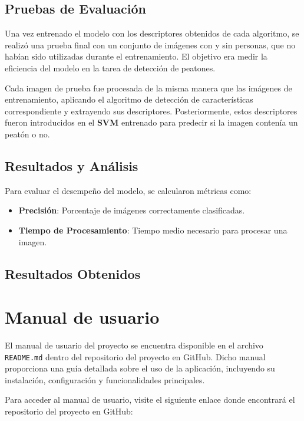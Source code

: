 \documentclass[a4paper]{article}
\begin{document}
\subsection{Pruebas de Evaluación}

Una vez entrenado el modelo con los descriptores obtenidos de cada algoritmo, se realizó una prueba final con un conjunto de imágenes con y sin personas, que no habían sido utilizadas durante el entrenamiento. El objetivo era medir la eficiencia del modelo en la tarea de detección de peatones.

Cada imagen de prueba fue procesada de la misma manera que las imágenes de entrenamiento, aplicando el algoritmo de detección de características correspondiente y extrayendo sus descriptores. Posteriormente, estos descriptores fueron introducidos en el \textbf{SVM} entrenado para predecir si la imagen contenía un peatón o no.

\subsection{Resultados y Análisis}

Para evaluar el desempeño del modelo, se calcularon métricas como:
\begin{itemize}
    \item \textbf{Precisión}: Porcentaje de imágenes correctamente clasificadas.
    \item \textbf{Tiempo de Procesamiento}: Tiempo medio necesario para procesar una imagen.
\end{itemize}


\subsection{Resultados Obtenidos}


\newpage

\section{Manual de usuario}

El manual de usuario del proyecto se encuentra disponible en el archivo \texttt{README.md} dentro del repositorio del proyecto en GitHub. Dicho manual proporciona una guía detallada sobre el uso de la aplicación, incluyendo su instalación, configuración y funcionalidades principales.
\par\hspace{1cm}

Para acceder al manual de usuario, visite el siguiente enlace donde encontrará el repositorio del proyecto en GitHub:
\end{document}
